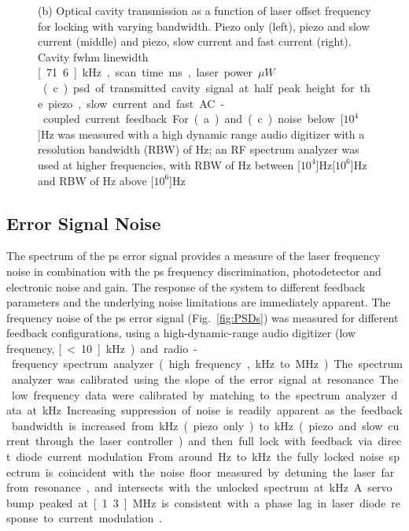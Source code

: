 \begin{figure}[htbp]
{(b) Optical cavity transmission as a function of laser offset frequency for locking with varying bandwidth.
Piezo only (left), piezo and slow current (middle) and piezo, slow current and fast current (right).
Cavity \gls*{fwhm} linewidth \unit[71.6]{kHz}, scan time \unit[100]{ms}, laser power \unit[170]{$\mu W$}.
(c) \Gls*{psd} of transmitted cavity signal at half peak height for the piezo, slow current and fast AC-coupled current feedback.
For (a) and (c) noise below \unit[$10^4$]{Hz} was measured with a high dynamic range audio digitizer with a resolution bandwidth (RBW) of \unit[12]{Hz}; an RF spectrum analyzer was used at higher frequencies, with RBW of \unit[30]{Hz} between \unit[$10^4$]{Hz}\textendash\unit[$10^6$]{Hz} and RBW of \unit[300]{Hz} above \unit[$10^6$]{Hz}} 
\end{figure}

\subsection{Error Signal Noise}
The spectrum of the \gls*{ps} error signal provides a measure of the laser frequency noise in combination with the \gls*{ps} frequency discrimination, photodetector and electronic noise and gain.
The response of the system to different feedback parameters and the underlying noise limitations are immediately apparent.
The frequency noise  of the \gls*{ps} error signal (Fig.~\ref{fig:PSDs}) was measured for different feedback configurations, using a high-dynamic-range audio digitizer (low frequency, \unit[\textless10]{kHz}) and radio-frequency spectrum analyzer (high frequency, \unit[10]{kHz} to \unit[30]{MHz}).
The spectrum analyzer was calibrated using the slope of the error signal at resonance.
The low frequency data were calibrated by matching to the spectrum analyzer data at \unit[10]{kHz}.  

Increasing suppression of noise is readily apparent as the feedback bandwidth is increased from \unit[1]{kHz} (piezo only) to \unit[50]{kHz} (piezo and slow current through the laser controller) and then full lock with feedback via direct diode current modulation.
From around \unit[450]{Hz} to \unit[350]{kHz} the fully locked noise spectrum is coincident with the noise floor measured by detuning the laser far from resonance, and intersects with the unlocked spectrum at \unit[700]{kHz}.
A servo bump peaked at \unit[1.3]{MHz} is consistent with a phase lag in laser diode response to current modulation~\cite{wieman_using_1991}.

